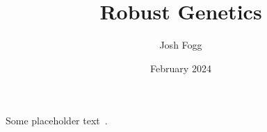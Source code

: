 \documentclass{article}
\title{Robust Genetics}
\author{Josh Fogg}
\date{February 2024}
\begin{document}
\maketitle

Some placeholder text~\cite{Markowitz00}.



\end{document}
